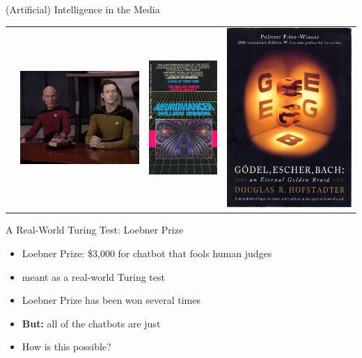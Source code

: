 \documentclass[xcolor={usenames,svgnames,x11names,dvipsnames,table}]{beamer}
\begin{document}
\begin{frame}{(Artificial) Intelligence in the Media}
\begin{center}
\begin{tabular}{cccc}
            &
            \includegraphics[width=.2\linewidth]{./img/measureofaman}
            &
            \includegraphics[width=.2\linewidth]{./img/neuromancer}
            &
            \includegraphics[width=.2\linewidth]{./img/godelescherbach}
        \end{tabular}
    \end{center}
\end{frame}

\begin{frame}{A Real-World Turing Test: Loebner Prize}
    \begin{itemize}
        \item Loebner Prize: \$3,000 for chatbot that fools human judges
        \item meant as a real-world Turing test
        \item Loebner Prize has been won several times
        \item \textbf{But:} all of the chatbots are just 
        \item How is this possible?
    \end{itemize}
\end{frame}
\end{document}
